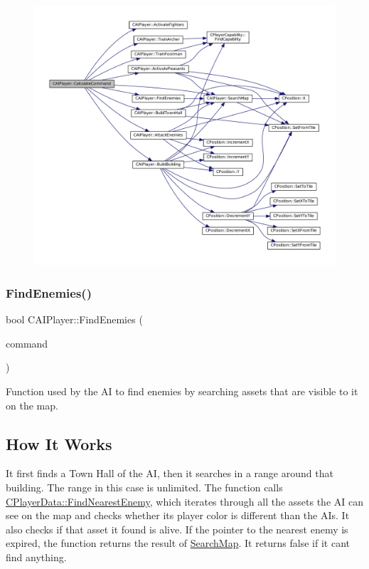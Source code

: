 \begin{figure}[H]
\begin{center}
\leavevmode
\includegraphics[width=350pt]{classCAIPlayer_ae2742efd250c7d6c00b659ccc29c4be3_cgraph}
\end{center}
\end{figure}
\hypertarget{classCAIPlayer_a33b1533570e7a00114d1b85b3551e395}{}\label{classCAIPlayer_a33b1533570e7a00114d1b85b3551e395} 
\subsubsection{\texorpdfstring{Find\+Enemies()}{FindEnemies()}}
{\footnotesize\ttfamily bool C\+A\+I\+Player\+::\+Find\+Enemies (\begin{DoxyParamCaption}\item[{\hyperlink{structSPlayerCommandRequest}{S\+Player\+Command\+Request} \&}]{command }\end{DoxyParamCaption})\hspace{0.3cm}{\ttfamily [protected]}}



Function used by the AI to find enemies by searching assets that are visible to it on the map. 

\hypertarget{classCAIPlayer_fehow_sec}{}\subsection{How It Works}\label{classCAIPlayer_fehow_sec}
It first finds a Town Hall of the AI, then it searches in a range around that building. The range in this case is unlimited. The function calls \hyperlink{classCPlayerData_a5f0a1280933f7bb9a65ab256ecff1a69}{C\+Player\+Data\+::\+Find\+Nearest\+Enemy}, which iterates through all the assets the AI can see on the map and checks whether its player color is different than the AI\textquotesingle{}s. It also checks if that asset it found is alive. If the pointer to the nearest enemy is expired, the function returns the result of \hyperlink{classCAIPlayer_afafbe8fc589e09a16ae1f02f2794d7b0}{Search\+Map}. It returns false if it can\textquotesingle{}t find anything. 

